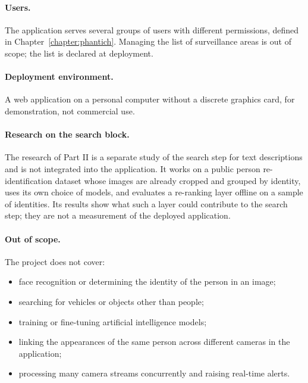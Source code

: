\paragraph{Users.} The application serves several groups of users with different permissions, defined in Chapter~\ref{chapter:phantich}. Managing the list of surveillance areas is out of scope; the list is declared at deployment.

\paragraph{Deployment environment.} A web application on a personal computer without a discrete graphics card, for demonstration, not commercial use.

\paragraph{Research on the search block.} The research of Part II is a separate study of the search step for text descriptions and is not integrated into the application. It works on a public person re-identification dataset whose images are already cropped and grouped by identity, uses its own choice of models, and evaluates a re-ranking layer offline on a sample of identities. Its results show what such a layer could contribute to the search step; they are not a measurement of the deployed application.

\paragraph{Out of scope.} The project does not cover:
\begin{itemize}
    \item face recognition or determining the identity of the person in an image;
    \item searching for vehicles or objects other than people;
    \item training or fine-tuning artificial intelligence models;
    \item linking the appearances of the same person across different cameras in the application;
    \item processing many camera streams concurrently and raising real-time alerts.
\end{itemize}
